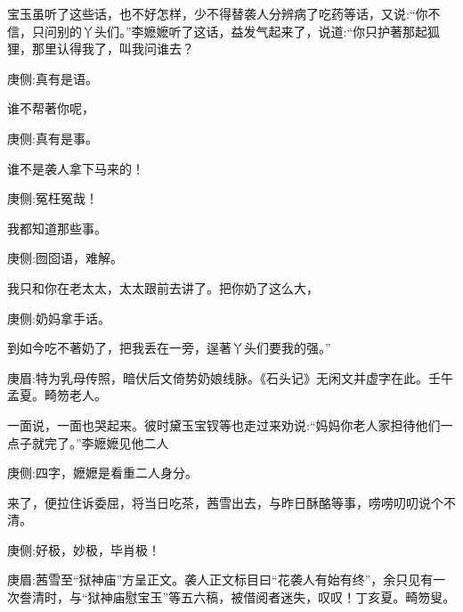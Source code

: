 \begin{parag}
    宝玉虽听了这些话，也不好怎样，少不得替袭人分辨病了吃药等话，又说:“你不信，只问别的丫头们。”李嬷嬷听了这话，益发气起来了，说道:“你只护著那起狐狸，那里认得我了，叫我问谁去？\begin{note}庚侧:真有是语。\end{note}谁不帮著你呢，\begin{note}庚侧:真有是事。\end{note}谁不是袭人拿下马来的！\begin{note}庚侧:冤枉冤哉！\end{note}我都知道那些事。\begin{note}庚侧:囫囵语，难解。\end{note}我只和你在老太太，太太跟前去讲了。把你奶了这么大，\begin{note}庚侧:奶妈拿手话。\end{note}到如今吃不著奶了，把我丢在一旁，逞著丫头们要我的强。”\begin{note}庚眉:特为乳母传照，暗伏后文倚势奶娘线脉。《石头记》无闲文并虚字在此。壬午孟夏。畸笏老人。\end{note}一面说，一面也哭起来。彼时黛玉宝钗等也走过来劝说:“妈妈你老人家担待他们一点子就完了。”李嬷嬷见他二人\begin{note}庚侧:四字，嬷嬷是看重二人身分。\end{note}来了，便拉住诉委屈，将当日吃茶，茜雪出去，与昨日酥酪等事，唠唠叨叨说个不清。\begin{note}庚侧:好极，妙极，毕肖极！\end{note}\begin{note}庚眉:茜雪至“狱神庙”方呈正文。袭人正文标目曰“花袭人有始有终”，余只见有一次誊清时，与“狱神庙慰宝玉”等五六稿，被借阅者迷失，叹叹！丁亥夏。畸笏叟。\end{note}
\end{parag}


